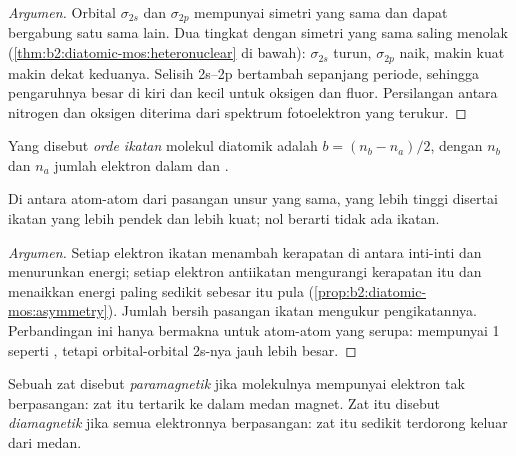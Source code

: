 \begin{proof}[Argumen]
Orbital $\sigma_{2s}$ dan $\sigma_{2p}$ mempunyai simetri yang sama dan dapat
bergabung satu sama lain. Dua tingkat dengan simetri yang sama saling
menolak (\cref{thm:b2:diatomic-mos:heteronuclear} di bawah): $\sigma_{2s}$
turun, $\sigma_{2p}$ naik, makin kuat makin dekat keduanya. Selisih 2s--2p
bertambah sepanjang periode, sehingga pengaruhnya besar di kiri dan kecil
untuk oksigen dan fluor. Persilangan antara nitrogen dan oksigen diterima
dari spektrum fotoelektron yang terukur.
\end{proof}

\begin{definition}\label{def:b2:diatomic-mos:bond-order}
Yang disebut \emph{orde ikatan} molekul diatomik adalah
$b = (n_b -
n_a)/2$, dengan $n_b$ dan $n_a$ jumlah elektron dalam  dan .
\end{definition}

\begin{proposition}\label{prop:b2:diatomic-mos:bond-order}
Di antara atom-atom dari pasangan unsur yang sama,  yang lebih
tinggi disertai ikatan yang lebih pendek dan lebih kuat;  nol
berarti tidak ada ikatan.
\end{proposition}

\begin{proof}[Argumen]
Setiap elektron ikatan menambah kerapatan di antara inti-inti dan
menurunkan energi; setiap elektron antiikatan mengurangi kerapatan itu dan
menaikkan energi paling sedikit sebesar itu pula
(\cref{prop:b2:diatomic-mos:asymmetry}). Jumlah bersih pasangan ikatan
mengukur pengikatannya. Perbandingan ini hanya bermakna untuk atom-atom
yang serupa:  mempunyai  1 seperti , tetapi
orbital-orbital 2s-nya jauh lebih besar.
\end{proof}

\begin{definition}\label{def:b2:diatomic-mos:magnetism}
Sebuah zat disebut \emph{paramagnetik} jika molekulnya
mempunyai elektron tak berpasangan: zat itu tertarik ke dalam medan
magnet. Zat itu disebut \emph{diamagnetik} jika semua
elektronnya berpasangan: zat itu sedikit terdorong keluar dari medan.
\end{definition}

